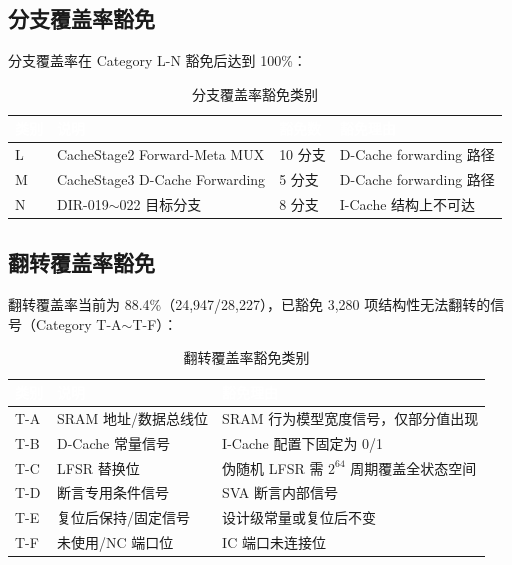\documentclass[12pt,a4paper]{ctexart}
\newcommand{\thcell}[1]{\textcolor{white}{\bfseries #1}}
\begin{document}
\subsection{分支覆盖率豁免}

分支覆盖率在 Category L-N 豁免后达到 100\%：

\begin{table}[H]
\centering
\caption{分支覆盖率豁免类别}
\small
\renewcommand{\arraystretch}{1.2}
\begin{tabular}{@{}p{1.2cm}p{4.2cm}p{2cm}p{5cm}@{}}
\toprule
\rowcolor{primaryblue}
\thcell{类别} & \thcell{说明} & \thcell{豁免数} & \thcell{豁免理由} \\
\midrule
\rowcolor{rowgray} L & CacheStage2 Forward-Meta MUX & 10 分支 & D-Cache forwarding 路径 \\
M & CacheStage3 D-Cache Forwarding & 5 分支 & D-Cache forwarding 路径 \\
\rowcolor{rowgray} N & DIR-019$\sim$022 目标分支 & 8 分支 & I-Cache 结构上不可达 \\
\bottomrule
\end{tabular}
\end{table}

\subsection{翻转覆盖率豁免}

翻转覆盖率当前为 88.4\%（24,947/28,227），已豁免 3,280 项结构性无法翻转的信号（Category T-A$\sim$T-F）：

\begin{table}[H]
\centering
\caption{翻转覆盖率豁免类别}
\small
\renewcommand{\arraystretch}{1.3}
\begin{tabular}{@{}p{1.5cm}p{4.5cm}p{6.5cm}@{}}
\toprule
\rowcolor{primaryblue}
\thcell{类别} & \thcell{说明} & \thcell{豁免理由} \\
\midrule
\rowcolor{rowgray} T-A & SRAM 地址/数据总线位 & SRAM 行为模型宽度信号，仅部分值出现 \\
T-B & D-Cache 常量信号 & I-Cache 配置下固定为 0/1 \\
\rowcolor{rowgray} T-C & LFSR 替换位 & 伪随机 LFSR 需 $2^{64}$ 周期覆盖全状态空间 \\
T-D & 断言专用条件信号 & SVA 断言内部信号 \\
\rowcolor{rowgray} T-E & 复位后保持/固定信号 & 设计级常量或复位后不变 \\
T-F & 未使用/NC 端口位 & IC 端口未连接位 \\
\bottomrule
\end{tabular}
\end{table}
\end{document}
